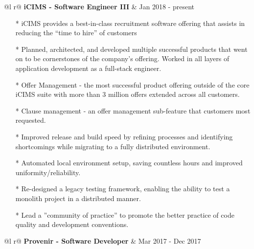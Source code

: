 \documentclass[a4paper,11pt]{article}
\begin{document}
\begin{tabularx}{\linewidth}{ @{}l r@{} }
\textbf{iCIMS - Software Engineer III} & \hfill Jan 2018 - present \\[3.75pt]
 {
\begin{minipage}[t]{\linewidth}
    \begin{itemize}[nosep,after=\strut, leftmargin=1em, itemsep=3pt]
        \item[*] iCIMS provides a best-in-class recruitment software offering that assists in reducing the “time to hire” of customers
        \item[*] Planned, architected, and developed multiple successful products that went on to be cornerstones of the company's offering. Worked in all layers of application development as a full-stack engineer.
        \item[*] Offer Management - the most successful product offering outside of the core iCIMS suite with more than 3 million offers extended across all customers.
        \item[*] Clause management - an offer management sub-feature that customers most requested.
        \item[*] Improved release and build speed by refining processes and identifying shortcomings while migrating to a fully distributed environment.
        \item[*] Automated local environment setup, saving countless hours and improved uniformity/reliability.
        \item[*] Re-designed a legacy testing framework, enabling the ability to test a monolith project in a distributed manner.
        \item[*] Lead a ”community of practice” to promote the better practice of code quality and development conventions.
    \end{itemize}
    \end{minipage}
    }
\end{tabularx}

\begin{tabularx}{\linewidth}{ @{}l r@{} }
\textbf{Provenir - Software Developer} & \hfill Mar 2017 - Dec 2017 \\[3.75pt]
\end{tabularx}
\end{document}
